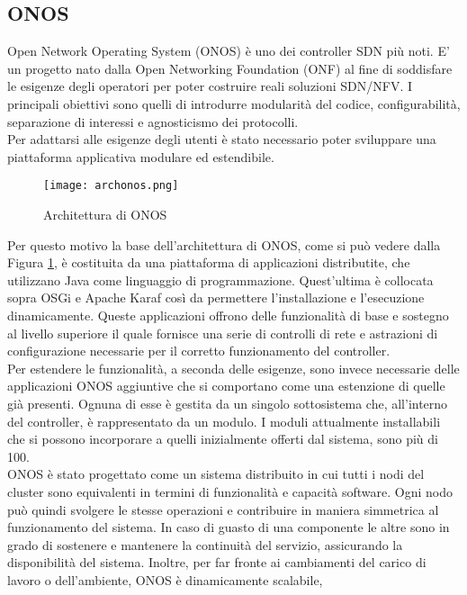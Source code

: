 \subsection{ONOS}
Open Network Operating System (ONOS) \cite{ONOS} è uno dei controller SDN più noti. 
E' un progetto nato dalla Open Networking Foundation (ONF) \cite{ONF} al fine di soddisfare le esigenze degli operatori per poter costruire reali soluzioni SDN/NFV.
I principali obiettivi sono quelli di introdurre modularità del codice, configurabilità, separazione di interessi e agnosticismo dei protocolli.
\\Per adattarsi alle esigenze degli utenti è stato necessario poter sviluppare una piattaforma applicativa modulare ed estendibile.
\begin{figure}[h]
    \centering
   \texttt{[image: archonos.png]}
    \caption{Architettura di ONOS \cite{archonos}}
    \label{fig:img3}
\end{figure}
Per questo motivo la base dell'architettura di ONOS, come si può vedere dalla Figura \ref{fig:img3}, è costituita da una piattaforma di applicazioni distributite, che utilizzano Java come linguaggio di programmazione.
Quest'ultima è collocata sopra OSGi \cite{osgi} e Apache Karaf \cite{Apache} così da permettere l'installazione e l'esecuzione dinamicamente. 
Queste applicazioni offrono delle funzionalità di base e sostegno al livello superiore il quale fornisce una serie di controlli di rete e astrazioni di configurazione necessarie per il corretto funzionamento del controller.
\\Per estendere le funzionalità, a seconda delle esigenze, sono invece necessarie delle applicazioni ONOS aggiuntive che si comportano come una estenzione di quelle già presenti. 
Ognuna di esse è gestita da un singolo sottosistema che, all'interno del controller, è rappresentato da un modulo.
I moduli attualmente installabili che si possono incorporare a quelli inizialmente offerti dal sistema, sono più di 100.
\\ONOS è stato progettato come un sistema distribuito in cui tutti i nodi del cluster sono equivalenti in termini di funzionalità e capacità software.
Ogni nodo può quindi svolgere le stesse operazioni e contribuire in maniera simmetrica al funzionamento del sistema.
In caso di guasto di una componente le altre sono in grado di sostenere e mantenere la continuità del servizio, assicurando la disponibilità del sistema. Inoltre, per far fronte ai cambiamenti del carico di lavoro o dell'ambiente, ONOS è dinamicamente scalabile, 
